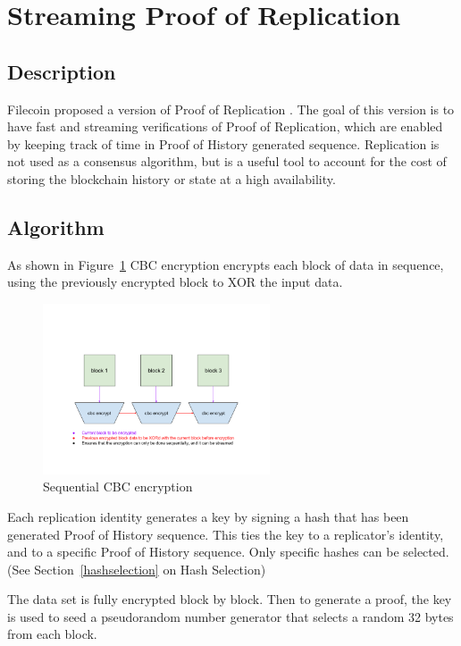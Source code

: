 \documentclass[12pt]{ltjsarticle}
\begin{document}
\section{Streaming Proof of Replication}\label{porep}
\subsection{Description}
Filecoin proposed a version of Proof of Replication \cite{filecoinporep}. The goal of this version is to have fast and streaming verifications of Proof of Replication, which are enabled by keeping track of time in Proof of History generated sequence. Replication is not used as a consensus algorithm, but is a useful tool to account for the cost of storing the blockchain history or state at a high availability.
\subsection{Algorithm}
As shown in Figure~\ref{fig:encrypt} CBC encryption encrypts each block of data in sequence, using the previously encrypted block to XOR the input data.

\begin{figure}
  \begin{center}
    \centering
    \includegraphics[width=0.6\textwidth]{../../figures/fig_7.png}
    \caption[Fig 7]{Sequential CBC encryption\label{fig:encrypt}}
  \end{center}
  \end{figure}

Each replication identity generates a key by signing a hash that has been generated Proof of History sequence. This ties the key to a replicator’s identity, and to a specific Proof of History sequence. Only specific hashes can be selected. (See Section~\ref{hashselection} on Hash Selection)

The data set is fully encrypted block by block. Then to generate a proof, the key is used to seed a pseudorandom number generator that selects a random 32 bytes from each block.
\end{document}
